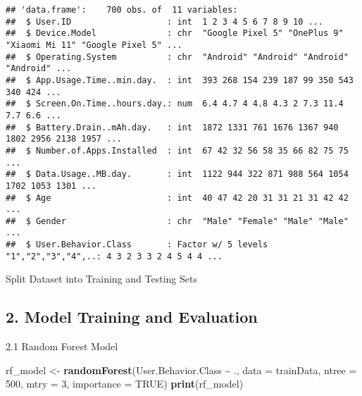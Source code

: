 \documentclass[
]{article}
\newenvironment{Shaded}{\begin{snugshade}}{\end{snugshade}}
\newcommand{\AttributeTok}[1]{\textcolor[rgb]{0.13,0.29,0.53}{#1}}
\newcommand{\ConstantTok}[1]{\textcolor[rgb]{0.56,0.35,0.01}{#1}}
\newcommand{\DecValTok}[1]{\textcolor[rgb]{0.00,0.00,0.81}{#1}}
\newcommand{\FloatTok}[1]{\textcolor[rgb]{0.00,0.00,0.81}{#1}}
\newcommand{\FunctionTok}[1]{\textcolor[rgb]{0.13,0.29,0.53}{\textbf{#1}}}
\newcommand{\NormalTok}[1]{#1}
\newcommand{\OtherTok}[1]{\textcolor[rgb]{0.56,0.35,0.01}{#1}}
\newcommand{\SpecialCharTok}[1]{\textcolor[rgb]{0.81,0.36,0.00}{\textbf{#1}}}
\begin{document}
\begin{verbatim}
## 'data.frame':    700 obs. of  11 variables:
##  $ User.ID                   : int  1 2 3 4 5 6 7 8 9 10 ...
##  $ Device.Model              : chr  "Google Pixel 5" "OnePlus 9" "Xiaomi Mi 11" "Google Pixel 5" ...
##  $ Operating.System          : chr  "Android" "Android" "Android" "Android" ...
##  $ App.Usage.Time..min.day.  : int  393 268 154 239 187 99 350 543 340 424 ...
##  $ Screen.On.Time..hours.day.: num  6.4 4.7 4 4.8 4.3 2 7.3 11.4 7.7 6.6 ...
##  $ Battery.Drain..mAh.day.   : int  1872 1331 761 1676 1367 940 1802 2956 2138 1957 ...
##  $ Number.of.Apps.Installed  : int  67 42 32 56 58 35 66 82 75 75 ...
##  $ Data.Usage..MB.day.       : int  1122 944 322 871 988 564 1054 1702 1053 1301 ...
##  $ Age                       : int  40 47 42 20 31 31 21 31 42 42 ...
##  $ Gender                    : chr  "Male" "Female" "Male" "Male" ...
##  $ User.Behavior.Class       : Factor w/ 5 levels "1","2","3","4",..: 4 3 2 3 3 2 4 5 4 4 ...
\end{verbatim}

Split Dataset into Training and Testing Sets

\begin{Shaded}
\end{Shaded}

\subsection{2. Model Training and
Evaluation}\label{model-training-and-evaluation}

2.1 Random Forest Model

\begin{Shaded}
\begin{Highlighting}[]
\NormalTok{rf\_model }\OtherTok{\textless{}{-}} \FunctionTok{randomForest}\NormalTok{(User.Behavior.Class }\SpecialCharTok{\textasciitilde{}}\NormalTok{ ., }\AttributeTok{data =}\NormalTok{ trainData, }\AttributeTok{ntree =} \DecValTok{500}\NormalTok{, }\AttributeTok{mtry =} \DecValTok{3}\NormalTok{, }\AttributeTok{importance =} \ConstantTok{TRUE}\NormalTok{)}
\FunctionTok{print}\NormalTok{(rf\_model)}
\end{Highlighting}
\end{Shaded}
\end{document}
